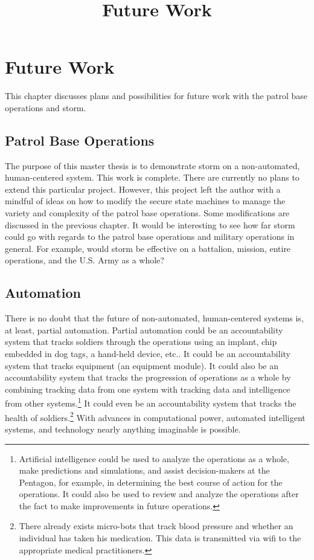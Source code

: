 \documentclass[../../main/main.tex]{subfiles}
\begin{document}
\title{Future Work}
\chapter{Future Work}\label{chp:future}

This chapter discusses plans and possibilities for future work with the patrol base operations and \gls{storm}.


\section{Patrol Base Operations}\label{sec:futureops}
The purpose of this master thesis is to demonstrate \gls{storm} on a non-automated, human-centered system.  This work is complete.  There are currently no plans to extend this particular project.  However, this project left the author with a mindful of ideas on how to modify the secure state machines to manage the variety and complexity of the patrol base operations.   Some modifications are discussed in the previous chapter.  It would be interesting to see how far \gls{storm} could go with regards to the patrol base operations and military operations in general.  For example, would \gls{storm} be effective on a battalion, mission, entire operations, and the U.S. Army as  a whole?


\section{Automation}\label{sec:futureautomation}
There is no doubt that the future of non-automated, human-centered systems is, at least, partial automation.  Partial automation could be an accountability system that tracks soldiers through the operations using an implant, chip embedded in dog tags, a hand-held device, etc..  It could be an accountability system that tracks equipment (an equipment module). It could also be an accountability system that tracks the progression of operations as a whole by combining tracking data from one system with tracking data and intelligence from other systems.\footnote{Artificial intelligence could be used to analyze the operations as a whole, make predictions and simulations, and assist decision-makers at the Pentagon, for example, in determining the best course of action for the operations.  It could also be used to review and analyze the operations after the fact to make improvements in future operations.}  It could even be an accountability system that tracks the health of soldiers.\footnote{There already exists micro-bots that track blood pressure and whether an individual has taken his medication.  This data is transmitted via wifi to the appropriate medical practitioners. }  With advances in computational power, automated intelligent systems, and technology nearly anything imaginable is possible. 
\end{document}

